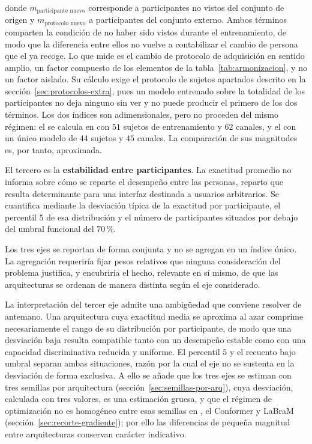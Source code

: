 donde $m_{\text{participante nuevo}}$ corresponde a participantes no vistos del conjunto de
origen y $m_{\text{protocolo nuevo}}$ a participantes del conjunto externo. Ambos términos
comparten la condición de no haber sido vistos durante el entrenamiento, de modo que la
diferencia entre ellos no vuelve a contabilizar el cambio de persona que el \dsi{} ya recoge.
Lo que mide es el cambio de protocolo de adquisición en sentido amplio, un factor compuesto
de los elementos de la tabla~\ref{tab:armonizacion}, y no un factor aislado. Su cálculo exige el protocolo de sujetos apartados descrito
en la sección~\ref{sec:protocolos-extra}, pues un modelo entrenado sobre la totalidad de los
participantes no deja ninguno sin ver y no puede producir el primero de los dos términos.
Los dos índices son adimensionales, pero no proceden del mismo régimen: el \dsi{} se calcula
en \loso{} con $51$ sujetos de entrenamiento y $62$ canales, y el \idp{} con un único modelo
de $44$ sujetos y $45$ canales. La comparación de sus magnitudes es, por tanto, aproximada.

El tercero es la \textbf{estabilidad entre participantes}. La exactitud promedio no informa
sobre cómo se reparte el desempeño entre las personas, reparto que resulta determinante
para una interfaz destinada a usuarios arbitrarios. Se cuantifica mediante la desviación
típica de la exactitud por participante, el percentil $5$ de esa distribución y el número
de participantes situados por debajo del umbral funcional del $70$\,\%.

Los tres ejes se reportan de forma conjunta y no se agregan en un índice único. La
agregación requeriría fijar pesos relativos que ninguna consideración del problema
justifica, y encubriría el hecho, relevante en sí mismo, de que las arquitecturas se
ordenan de manera distinta según el eje considerado.

La interpretación del tercer eje admite una ambigüedad que conviene resolver de antemano.
Una arquitectura cuya exactitud media se aproxima al azar comprime necesariamente el rango
de su distribución por participante, de modo que una desviación baja resulta compatible
tanto con un desempeño estable como con una capacidad discriminativa reducida y uniforme.
El percentil $5$ y el recuento bajo umbral separan ambas situaciones, razón por la cual el
eje no se sustenta en la desviación de forma exclusiva. A ello se añade que los tres ejes
se estiman con tres semillas por arquitectura (sección~\ref{sec:semillas-por-arq}), cuya
desviación, calculada con tres valores, es una estimación gruesa, y que el régimen de
optimización no es homogéneo entre esas semillas en \eegnet{}, el Conformer y LaBraM
(sección~\ref{sec:recorte-gradiente}); por ello las diferencias de pequeña magnitud entre
arquitecturas conservan carácter indicativo.


